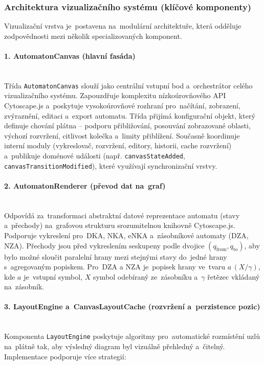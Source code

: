 \documentclass[
  master,
  program=ainfvs,
  printversion,
  figures=false,
  tables=false,
  glossaries,
  index
]{kidiplom}
\begin{document}
\subsubsection{Architektura vizualizačního systému (klíčové komponenty)} 
Vizualizační vrstva je~postavena na~modulární architektuře, která odděluje zodpovědnosti mezi několik specializovaných komponent.

\paragraph{1. AutomatonCanvas (hlavní fasáda)} \mbox{} \\
Třída \texttt{AutomatonCanvas} slouží jako centrální vstupní bod a~orchestrátor celého vizualizačního systému. Zapouzdřuje komplexitu nízkoúrovňového API Cy\-to\-scape.js a~poskytuje vysokoúrovňové rozhraní pro~načítání, zobrazení, zvýraznění, editaci a~export automatu. Třída přijímá konfigurační objekt, který definuje chování plátna -- podporu přibližování, posouvání zobrazované oblasti, výchozí rozvržení, citlivost kolečka a~limity přiblížení. Současně koordinuje interní moduly (vykreslovač, rozvržení, editory, historii, cache rozvržení) a~publikuje doménové události (např. \texttt{canvasStateAdded}, \texttt{canvasTransitionModified}), které využívají synchronizační vrstvy.

\paragraph{2. AutomatonRenderer (převod dat na~graf)} \mbox{} \\
Odpovídá za~transformaci abstraktní datové reprezentace automatu (stavy a~přechody) na~grafovou strukturu srozumitelnou knihovně Cytoscape.js. Podporuje vykreslení pro~\gls{DKA}, \gls{NKA}, \gls{eNKA} a~zásobníkové automaty (\gls{DZA}, \gls{NZA}). Přechody jsou před vykreslením seskupeny podle dvojice $(q_{\text{from}}, q_{\text{to}})$, aby bylo možné sloučit paralelní hrany mezi stejnými stavy do~jedné hrany s~agregovaným popiskem. Pro~\gls{DZA} a \gls{NZA} je~popisek hrany ve~tvaru $a\,(X/\gamma)$, kde $a$ je~vstupní symbol, $X$ symbol odebíraný ze~zásobníku a~$\gamma$ řetězec vkládaný na~zásobník.

\paragraph{3. LayoutEngine a~CanvasLayoutCache (rozvržení a~perzistence pozic)} \mbox{} \\
Komponenta \texttt{LayoutEngine} poskytuje algoritmy pro~automatické rozmístění uzlů na~plátně tak, aby výsledný diagram byl vizuálně přehledný a~čitelný. Implementace podporuje více strategií:
\end{document}
